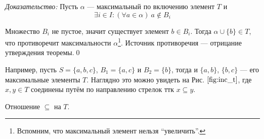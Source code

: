 {\it Доказательство:}
Пусть $\alpha$ --- максимальный по включению элемент $T$ и
\[
	\exists i\in I:(\forall a\in\alpha)~a\notin B_{i}
\]

Множество $B_{i}$ не пустое, значит существует элемент $b\in B_{i}$.
Тогда $\alpha\cup \{b\}\in T$, что противоречит
максимальности $\alpha$\footnote[][-2cm]{Вспомним, что максимальный элемент
нельзя ``увеличить''.}.
Источник противоречия --- отрицание утверждения теоремы.\qed

Например, пусть $S=\{a,b,c\}$, $B_1=\{a,c\}$ и $B_2=\{b\}$, тогда
и $\{a,b\}$, $\{b,c\}$ --- его максимальные элементы $T$.
Наглядно это можно увидеть на Рис. $\ref{fig:inc_t}$, где
$x,y\in T$ соединены путём по направлению стрелок ттк $x\subseteq y$.

\begin{marginfigure}[-1.5cm]
	\center

	\caption{Отношение $\subseteq$ на $T$.}\label{fig:inc_t}
\end{marginfigure}
